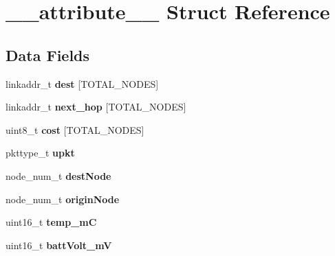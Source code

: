 \hypertarget{struct____attribute____}{}\section{\+\_\+\+\_\+attribute\+\_\+\+\_\+ Struct Reference}
\label{struct____attribute____}
\subsection*{Data Fields}
\begin{DoxyCompactItemize}
\item 
\mbox{\label{struct____attribute_____a795859d47d4afdfcbd73fb6e2f349f5c}} 
linkaddr\+\_\+t {\bfseries dest} \mbox{[}T\+O\+T\+A\+L\+\_\+\+N\+O\+D\+ES\mbox{]}
\item 
\mbox{\label{struct____attribute_____a9aa5ed9a7c4fd87ce1fd049e6d67c2ff}} 
linkaddr\+\_\+t {\bfseries next\+\_\+hop} \mbox{[}T\+O\+T\+A\+L\+\_\+\+N\+O\+D\+ES\mbox{]}
\item 
\mbox{\label{struct____attribute_____a2f27bb3e45af50fc419862a54adfece0}} 
uint8\+\_\+t {\bfseries cost} \mbox{[}T\+O\+T\+A\+L\+\_\+\+N\+O\+D\+ES\mbox{]}
\item 
\mbox{\label{struct____attribute_____ac197715c122b4a9e35e2db225fbe3eb4}} 
pkttype\+\_\+t {\bfseries upkt}
\item 
\mbox{\label{struct____attribute_____af79da32bb9fba11e00fc780102a09067}} 
node\+\_\+num\+\_\+t {\bfseries dest\+Node}
\item 
\mbox{\label{struct____attribute_____a8cda283bf48148388e1a0731653658e3}} 
node\+\_\+num\+\_\+t {\bfseries origin\+Node}
\item 
\mbox{\label{struct____attribute_____abfc55e46b0978374403c81e45452460d}} 
uint16\+\_\+t {\bfseries temp\+\_\+mC}
\item 
\mbox{\label{struct____attribute_____aba5b736048ea89b5460e8b0b361c20a6}} 
uint16\+\_\+t {\bfseries batt\+Volt\+\_\+mV}
\item 

\end{DoxyCompactItemize}
